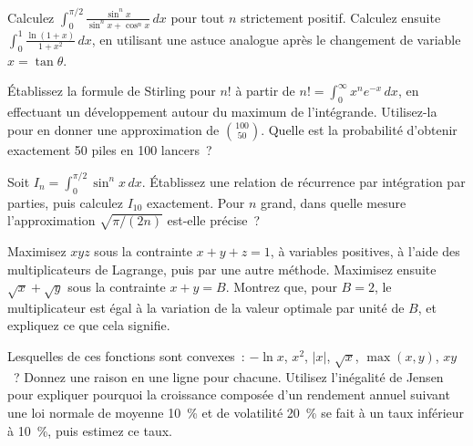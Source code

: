 \begin{question}\label{iq:iv1:calculus-and-optimisation:5}
Calculez $\int_0^{\pi/2} \frac{\sin^n x}{\sin^n x + \cos^n x}\,dx$ pour tout $n$ strictement positif. Calculez ensuite $\int_0^1 \frac{\ln(1 + x)}{1 + x^2}\,dx$, en utilisant une astuce analogue après le changement de variable $x = \tan\theta$.
\end{question}

\begin{question}\label{iq:iv1:calculus-and-optimisation:6}
Établissez la formule de Stirling pour $n!$ à partir de $n! = \int_0^\infty x^n e^{-x}\,dx$, en effectuant un développement autour du maximum de l'intégrande. Utilisez-la pour en donner une approximation de $\binom{100}{50}$. Quelle est la probabilité d'obtenir exactement 50 piles en 100 lancers~?
\end{question}

\begin{question}\label{iq:iv1:calculus-and-optimisation:7}
Soit $I_n = \int_0^{\pi/2} \sin^n x\,dx$. Établissez une relation de récurrence par intégration par parties, puis calculez $I_{10}$ exactement. Pour $n$ grand, dans quelle mesure l'approximation $\sqrt{\pi/(2n)}$ est-elle précise~?
\end{question}

\begin{question}\label{iq:iv1:calculus-and-optimisation:8}
Maximisez $xyz$ sous la contrainte $x + y + z = 1$, à variables positives, à l'aide des multiplicateurs de Lagrange, puis par une autre méthode. Maximisez ensuite $\sqrt{x} + \sqrt{y}$ sous la contrainte $x + y = B$. Montrez que, pour $B = 2$, le multiplicateur est égal à la variation de la valeur optimale par unité de $B$, et expliquez ce que cela signifie.
\end{question}

\begin{question}\label{iq:iv1:calculus-and-optimisation:9}
Lesquelles de ces fonctions sont convexes~: $-\ln x$, $x^2$, $|x|$, $\sqrt{x}$, $\max(x, y)$, $xy$~? Donnez une raison en une ligne pour chacune. Utilisez l'inégalité de Jensen pour expliquer pourquoi la croissance composée d'un rendement annuel suivant une loi normale de moyenne 10~\% et de volatilité 20~\% se fait à un taux inférieur à 10~\%, puis estimez ce taux.
\end{question}

